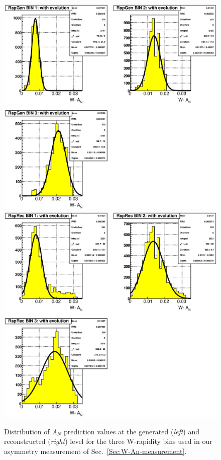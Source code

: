 \documentclass[12pt]{article}
\begin{document}
\begin{figure}[htbp]
\begin{center}
\includegraphics[scale=0.43]{images/systematics/plot_Wm_An_evol_ZK_Vs_RapGen_projs}
\includegraphics[scale=0.43]{images/systematics/plot_Wm_An_evol_ZK_Vs_RapRec_projs}
\end{center}
\caption{Distribution of $A_{N}$ prediction values at the generated ({\it left}) and reconstructed ({\it right}) level for the three W-rapidity bins used in our asymmetry measurement of Sec.~\ref{Sec:W-An-measurement}.}
\label{fig:SysAnRap} 
\end{figure}
\end{document}

